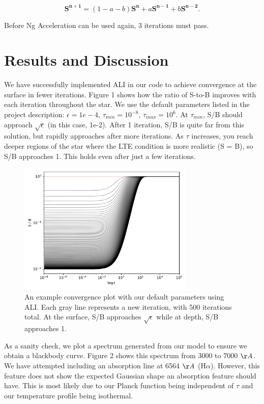 \documentclass[12pt]{article}
\begin{document}
\begin{equation}
    \mathbf{S^{n+1}} = (1-a-b)\mathbf{S^{n}} + a\mathbf{S^{n-1}} + b\mathbf{S^{n-2}}.
\end{equation}

Before Ng Acceleration can be used again, 3 iterations must pass.


\section{Results and Discussion}
We have successfully implemented ALI in our code to achieve convergence at the surface in fewer iterations. Figure 1 shows how the ratio of S-to-B improves with each iteration throughout the star. We use the default parameters listed in the project description: $\epsilon = 1e-4$, $\tau_{min} = 10^{-8}$, $\tau_{max} = 10^{6}$. At $\tau_{min}$, S/B should approach $\sqrt\epsilon$ (in this case, 1e-2). After 1 iteration, S/B is quite far from this solution, but rapidly approaches after more iterations. As $\tau$ increases, you reach deeper regions of the star where the LTE condition is more realistic (S = B), so S/B approaches 1. This holds even after just a few iterations. 

\begin{figure}[ht]
 \centering
 \includegraphics[width=0.75\textwidth]{S_B_convergence_noNg.pdf}
 \caption{An example convergence plot with our default parameters using ALI. Each gray line represents a new iteration, with 500 iterations total. At the surface, S/B approaches $\sqrt\epsilon$ while at depth, S/B approaches 1.}
\end{figure}

As a sanity check, we plot a spectrum generated from our model to ensure we obtain a blackbody curve. Figure 2 shows this spectrum from 3000 to 7000 $\AA$. We have attempted including an absorption line at 6564 $\AA$ (H$\alpha$). However, this feature does not show the expected Gaussian shape an absorption feature should have. This is most likely due to our Planck function being independent of $\tau$ and our temperature profile being isothermal. 
\end{document}
